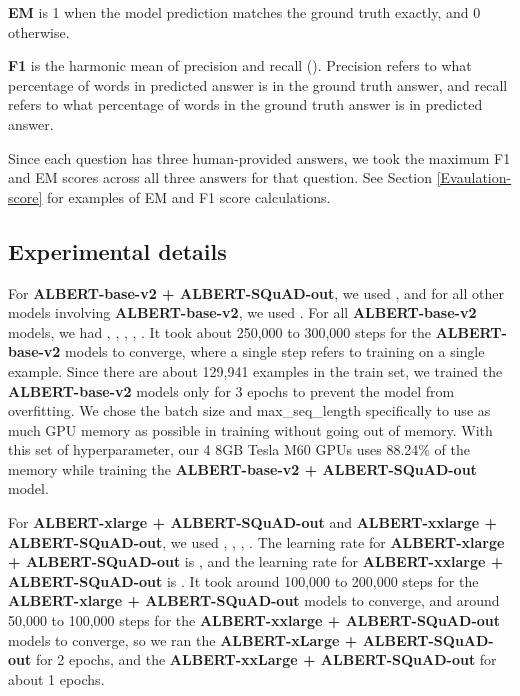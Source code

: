 \documentclass{article}
\begin{document}
\textbf{EM} is 1 when the model prediction matches the ground truth exactly, and 0 otherwise. 

\textbf{F1} is the harmonic mean of precision and recall (). Precision refers to what percentage of words in predicted answer is in the ground truth answer, and recall refers to what percentage of words in the ground truth answer is in predicted answer. 

Since each question has three human-provided answers, we took the maximum F1 and EM scores across all three answers for that question. See Section \ref{Evaulation-score} for examples of EM and F1 score calculations.








\subsection{Experimental details} \label{experiment}
For \textbf{ALBERT-base-v2 + ALBERT-SQuAD-out}, we used , and for all other models involving \textbf{ALBERT-base-v2}, we used . For all \textbf{ALBERT-base-v2} models, we had , , , , . It took about 250,000 to 300,000 steps for the \textbf{ALBERT-base-v2} models to converge, where a single step refers to training on a single example. Since there are about 129,941 examples in the train set, we trained the \textbf{ALBERT-base-v2} models only for 3 epochs to prevent the model from overfitting. We chose the batch size and max\_seq\_length specifically to use as much GPU memory as possible in training without going out of memory. With this set of hyperparameter, our 4 8GB Tesla M60 GPUs uses 88.24\% of the memory while training the \textbf{ALBERT-base-v2 + ALBERT-SQuAD-out} model. 

For \textbf{ALBERT-xlarge + ALBERT-SQuAD-out} and \textbf{ALBERT-xxlarge + ALBERT-SQuAD-out}, we used , , , . The learning rate for \textbf{ALBERT-xlarge + ALBERT-SQuAD-out} is , and the learning rate for \textbf{ALBERT-xxlarge + ALBERT-SQuAD-out} is . It took around 100,000 to 200,000 steps for the \textbf{ALBERT-xlarge + ALBERT-SQuAD-out} models to converge, and around 50,000 to 100,000 steps for the \textbf{ALBERT-xxlarge + ALBERT-SQuAD-out} models to converge, so we ran the \textbf{ALBERT-xLarge + ALBERT-SQuAD-out} for 2 epochs, and the \textbf{ALBERT-xxLarge + ALBERT-SQuAD-out} for about 1 epochs.


    
\end{document}
